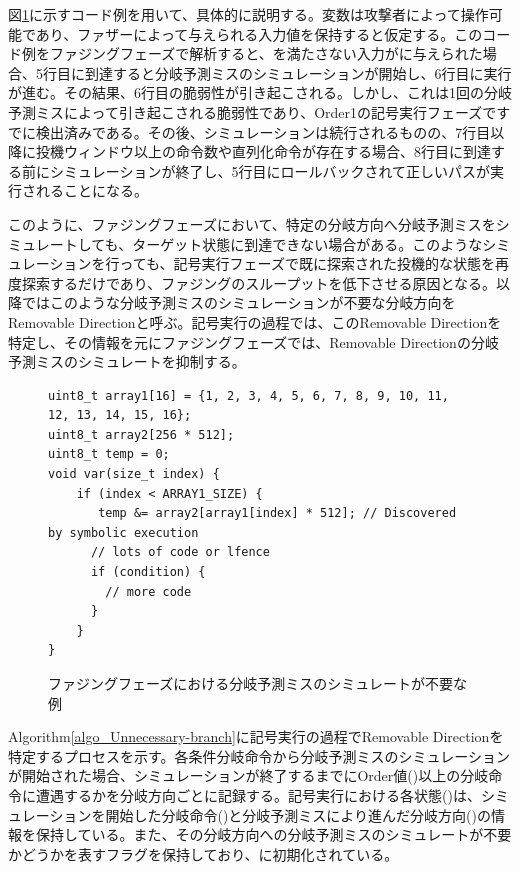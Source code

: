 図\ref{Unnecessary_branch}に示すコード例を用いて、具体的に説明する。変数は攻撃者によって操作可能であり、ファザーによって与えられる入力値を保持すると仮定する。このコード例をファジングフェーズで解析すると、を満たさない入力がに与えられた場合、5行目に到達すると分岐予測ミスのシミュレーションが開始し、6行目に実行が進む。その結果、6行目の脆弱性が引き起こされる。しかし、これは1回の分岐予測ミスによって引き起こされる脆弱性であり、Order1の記号実行フェーズですでに検出済みである。その後、シミュレーションは続行されるものの、7行目以降に投機ウィンドウ以上の命令数や直列化命令が存在する場合、8行目に到達する前にシミュレーションが終了し、5行目にロールバックされて正しいパスが実行されることになる。\par

このように、ファジングフェーズにおいて、特定の分岐方向へ分岐予測ミスをシミュレートしても、ターゲット状態に到達できない場合がある。このようなシミュレーションを行っても、記号実行フェーズで既に探索された投機的な状態を再度探索するだけであり、ファジングのスループットを低下させる原因となる。以降ではこのような分岐予測ミスのシミュレーションが不要な分岐方向をRemovable Directionと呼ぶ。記号実行の過程では、このRemovable Directionを特定し、その情報を元にファジングフェーズでは、Removable Directionの分岐予測ミスのシミュレートを抑制する。\par

\begin{figure}
  \begin{verbatim}
uint8_t array1[16] = {1, 2, 3, 4, 5, 6, 7, 8, 9, 10, 11, 12, 13, 14, 15, 16}; 
uint8_t array2[256 * 512];
uint8_t temp = 0;
void var(size_t index) {
    if (index < ARRAY1_SIZE) {
       temp &= array2[array1[index] * 512]; // Discovered by symbolic execution
      // lots of code or lfence
      if (condition) {
        // more code
      }
    }
}
   \end{verbatim}
  \caption{ファジングフェーズにおける分岐予測ミスのシミュレートが不要な例}
  \label{Unnecessary_branch}
\end{figure}

Algorithm\ref{algo_Unnecessary-branch}に記号実行の過程でRemovable Directionを特定するプロセスを示す。各条件分岐命令から分岐予測ミスのシミュレーションが開始された場合、シミュレーションが終了するまでにOrder値()以上の分岐命令に遭遇するかを分岐方向ごとに記録する。記号実行における各状態(\var{$\mu$})は、シミュレーションを開始した分岐命令()と分岐予測ミスにより進んだ分岐方向()の情報を保持している。また、その分岐方向への分岐予測ミスのシミュレートが不要かどうかを表すフラグを保持しており、に初期化されている。\par

